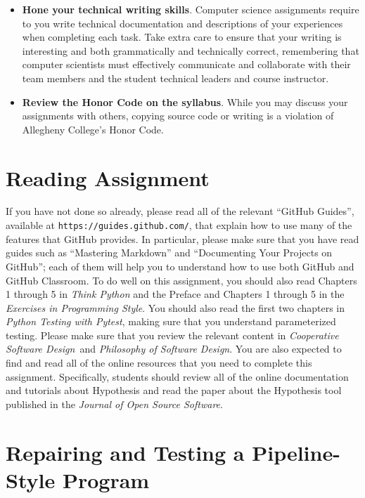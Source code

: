 \documentclass[11pt]{article}
\newcommand{\cooperative}{{\em Cooperative Software Design\/}}
\newcommand{\philosophy}{{\em Philosophy of Software Design\/}}
\newcommand{\pytest}{{\em Python Testing with Pytest\/}}
\newcommand{\url}[1]{\lstinline{#1}}
\begin{document}
\begin{itemize}
\item {\bf Hone your technical writing skills}. Computer science assignments
  require to you write technical documentation and descriptions of your
  experiences when completing each task. Take extra care to ensure that your
  writing is interesting and both grammatically and technically correct,
  remembering that computer scientists must effectively communicate and
  collaborate with their team members and the student technical leaders and
  course instructor.

\item {\bf Review the Honor Code on the syllabus}. While you may discuss your
  assignments with others, copying source code or writing is a violation of
  Allegheny College's Honor Code.

\end{itemize}

\section*{Reading Assignment}

If you have not done so already, please read all of the relevant ``GitHub
Guides'', available at \url{https://guides.github.com/}, that explain how to use
many of the features that GitHub provides. In particular, please make sure that
you have read guides such as ``Mastering Markdown'' and ``Documenting Your
Projects on GitHub''; each of them will help you to understand how to use both
GitHub and GitHub Classroom. To do well on this assignment, you should also read
Chapters 1 through 5 in {\em Think Python\/} and the Preface and Chapters 1
through 5 in the {\em Exercises in Programming Style\/}.
%
You should also read the first two chapters in \pytest, making sure that you
understand parameterized testing.
%
Please make sure that you review the relevant content in \cooperative~and
\philosophy.
%
You are also expected to find and read all of the online resources that you need
to complete this assignment.
%
Specifically, students should review all of the online documentation and
tutorials about Hypothesis and read the paper about the Hypothesis tool
published in the {\em Journal of Open Source Software}.

\section*{Repairing and Testing a Pipeline-Style Program}
\end{document}
